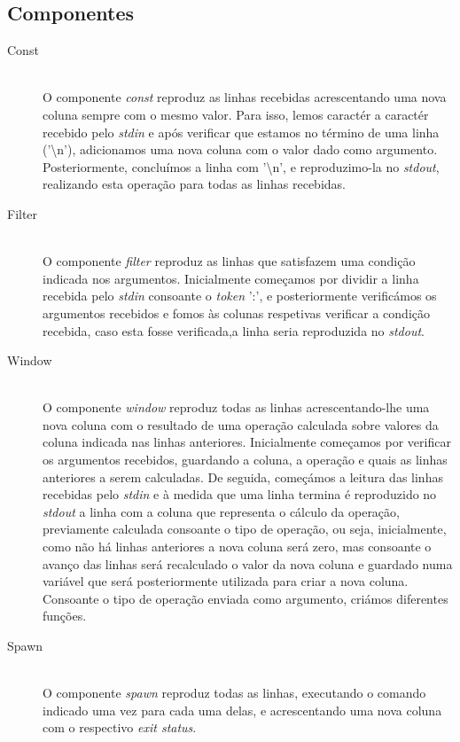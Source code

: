 \documentclass[12pt]{article}
\begin{document}
\subsection{Componentes} 
\begin{description} 
\item[Const] \hfill \\
O componente \textit{const} reproduz as linhas recebidas acrescentando uma nova coluna sempre com o mesmo valor. Para isso, lemos caractér a caractér recebido pelo \textit{stdin} e após verificar que estamos no término de uma linha ('\textbackslash n'), adicionamos uma nova coluna com o valor dado como argumento. Posteriormente, concluímos a linha com '\textbackslash n', e reproduzimo-la no \textit{stdout}, realizando esta operação para todas as linhas recebidas. 

\item[Filter] \hfill \\
O componente \textit{filter} reproduz as linhas que satisfazem uma condição indicada nos argumentos. Inicialmente começamos por dividir a linha recebida pelo \textit{stdin} consoante o \textit{token} ':', e posteriormente verificámos os argumentos recebidos e fomos às colunas respetivas verificar a condição recebida, caso esta fosse verificada,a linha seria reproduzida no \textit{stdout}.

\item[Window] \hfill \\
O componente \textit{window} reproduz todas as linhas acrescentando-lhe uma nova coluna com o resultado de uma operação calculada sobre valores da coluna indicada nas linhas anteriores. Inicialmente começamos por verificar os argumentos recebidos, guardando a coluna, a operação e quais as linhas anteriores a serem calculadas. De seguida, começámos a leitura das linhas recebidas pelo \textit{stdin} e à medida que uma linha termina é reproduzido no \textit{stdout} a linha com a coluna que representa o cálculo da operação, previamente calculada consoante o tipo de operação, ou seja, inicialmente, como não há linhas anteriores a nova coluna será zero, mas consoante o avanço das linhas será recalculado o valor da nova coluna e guardado numa variável que será posteriormente utilizada para criar a nova coluna. Consoante o tipo de operação enviada como argumento, criámos diferentes funções.

\item[Spawn] \hfill \\
O componente \textit{spawn} reproduz todas as linhas, executando o comando indicado uma vez para cada uma delas, e acrescentando uma nova coluna com o respectivo \textit{exit status}. 

\end{description} 
\end{document}
